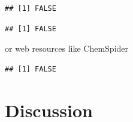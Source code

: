 \begin{knitrout}
\color{fgcolor}\begin{kframe}
\begin{alltt}
\hlstd{(}\hlstd{)}
\end{alltt}


{\ttfamily\noindent\itshape\color{messagecolor}{\#\# Hyphens not at position 15 and 26.}}\begin{verbatim}
## [1] FALSE
\end{verbatim}
\begin{alltt}
\hlstd{(}\hlstd{)}
\end{alltt}


{\ttfamily\noindent\itshape\color{messagecolor}{\#\# Checksum is not correct! 5 vs. 6}}\begin{verbatim}
## [1] FALSE
\end{verbatim}
\end{kframe}
\end{knitrout}

or web resources like ChemSpider
\begin{knitrout}
\color{fgcolor}\begin{kframe}
\begin{alltt}
\hlstd{(}\hlstd{,}
   \hlstd{=} \hlstd{)}
\end{alltt}
\begin{verbatim}
## [1] FALSE
\end{verbatim}
\end{kframe}
\end{knitrout}

\newpage
\section[Discussion]{Discussion}
